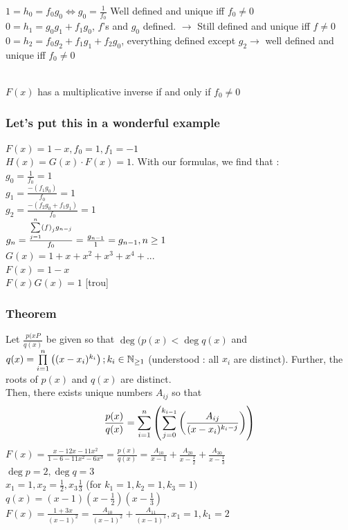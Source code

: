 \documentclass[12pt,a4paper]{article}
\begin{document}
\begin{enumerate}
	$1 = h_0 = f_0g_0 \iff g_0 = \frac{1}{f_0}$ Well defined and unique iff $f_0 \neq 0$\\
	$0 = h_1 = g_0g_1 +f_1g_0$, $f$'s and $g_0$ defined. $ \to $ Still defined and unique iff $f \neq 0$\\
	$0 =h_2 = f_0g_2 +f_1g_1+f_2g_0$, everything defined except $g_2 \to$  well defined and unique iff $f_0 \neq 0$ 
	\begin{boite}
	\\
	 $F(x)$ has a multiplicative inverse if and only if $f_0 \neq 0$ 
	\end{boite}
\end{enumerate}
\subsubsection{Let's put this in a wonderful example}
$F(x) = 1-x, f_0 = 1,f_1 = -1$\\
$H(x) = G(x)\cdot F(x) = 1$. With our formulas, we find that :\\
$g_0 = \frac{1}{f_0} = 1$\\
$g_1 = \frac{-(f_1g_0)}{f_0} = 1$\\
$g_2 = \frac{-(f_2g_0+f_1g_1)}{f_0} = 1$\\
$g_n = \frac{\somme{n}{j=1}f_jg_{n-j}}{f_0} = \frac{g_{n-1}}{1} = g_{n-1}, n\geq 1$\\
$G(x) = 1+x+x^2+x^3+x^4+...$\\
$F(x) = 1-x$\\
$F(x)G(x) = 1$
[trou]

\subsubsection{Theorem}
Let $\frac{p(xP}{q(x)}$ be given so that $\deg(p(x) < \deg q(x)$ and $q(x) = \produit{n}{i=1}{(x-x_i)^{k_i}}; k_i \in \N_{\geq 1}$ (understood : all $x_i$ are distinct). Further, the roots of $p(x)$ and $q(x)$ are distinct.\\
Then, there exists unique numbers $A_{ij}$ so that
\begin{equation}
	\frac{p(x)}{q(x)} = \somme{n}{i=1}{\somme{k_{i-1}}{j=0}{\frac{A_{ij}}{(x-x_i)^{k_i-j}}}}
\end{equation}
 $F(x) = \frac{x-12x-11x^2}{1-6-11x^2-6x^3} = \frac{p(x)}{q(x)} = \frac{A_{10}}{x-1} + \frac{A_{20}}{x-\frac{1}{2}} + \frac{A_{30}}{x-\frac{1}{3}}$\\
 $\deg p = 2, \deg q = 3$\\
$x_1=1,x_2=\frac{1}{2}, x_3\frac{1}{3}$ (for $k_1=1, k_2=1, k_3=1)$\\
$q(x) = (x-1)(x-\frac{1}{2})(x-\frac{1}{3})$\\
$F(x) = \frac{1+3x}{(x-1)^2} = \frac{A_{10}}{(x-1)^2} + \frac{A_{11}}{(x-1)^1}, x_1=1, k_1=2$
\end{document}
